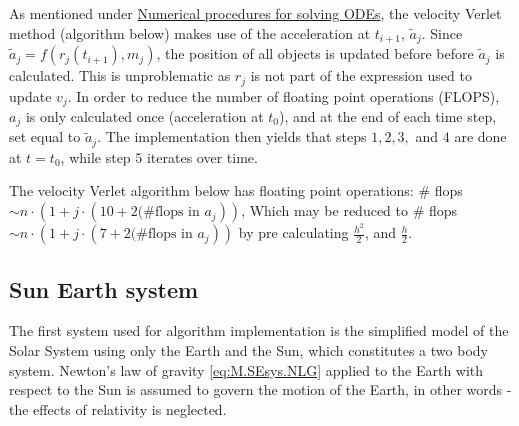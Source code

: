 \documentclass[%
oneside,                 %
final,                   %
10pt]{article}
\begin{document}
As mentioned under \hyperref[sec:NPs]{Numerical procedures for solving ODEs}, the velocity Verlet method (algorithm below) makes use of the acceleration at $t_{i+1}$, $\tilde{a}_j$. Since $\tilde{a}_j=f(r_j(t_{i+1}),m_j)$, the position of all objects is updated before before $\tilde{a}_j$ is calculated. This is unproblematic as $r_j$ is not part of the expression used to update $v_j$. In order to reduce the number of floating point operations (FLOPS), $a_j$ is only calculated once (acceleration at $t_0$), and at the end of each time step, set equal to $\tilde{a}_j$. The implementation then yields that steps $1,2,3,$ and $4$ are done at $t=t_0$, while step $5$ iterates over time. \newline

The velocity Verlet algorithm below has floating point operations: \newline
\# flops$\sim n \cdot (1+j \cdot (10+2\text{(\#flops in } a_j))$, 
Which may be reduced to \# flops$\sim n \cdot (1+j \cdot (7+2\text{(\#flops in } a_j))$ by pre calculating $\frac{h^2}{2}$, and $ \frac{h}{2}$.
\begin{center}\end{center}
  
  
  
\subsection{Sun Earth system}                                                                                                               
The first system used for algorithm implementation is the simplified model of the Solar System using only the Earth and the Sun, which constitutes a two body system. Newton's law of gravity \eqref{eq:M.SEsys.NLG} applied to the Earth with respect to the Sun  is assumed to govern the motion of the Earth, in other words - the effects of relativity is neglected. \newline
\end{document}
